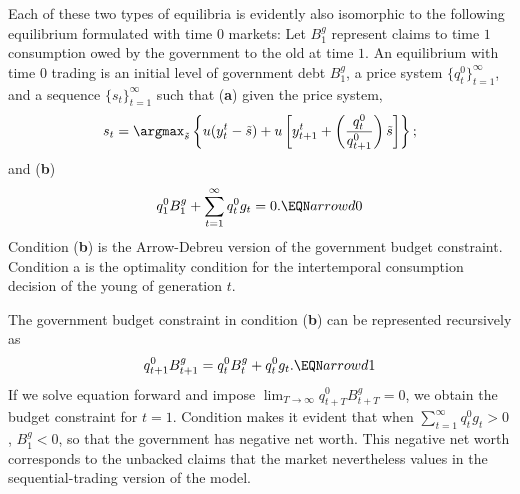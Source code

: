   Each of these two types of equilibria is evidently also
isomorphic to the following equilibrium
formulated with time $0$ markets:
\medskip
{} Let $B^g_1$ represent claims to time $1$ consumption
owed by the government to the old at time $1$.
An equilibrium with  time $0$ trading
is an initial level of government
debt $B^g_1$, a price system $\{q_t^0\}_{t=1}^\infty$, and
a sequence $\{s_t\}_{t=1}^\infty$ such that ({\bf a})
given the price system,
$$ s_t = \argmax_{\tilde s} \left\{ u(y_t^t - \tilde s)
     + u \left[y^t_{t+1}
 + \left({q_t^0 \over q^0_{t+1}}\right) \tilde s \right] \right\};
                                                    $$
and ({\bf b})
$$ q_1^0 B_1^g + \sum_{t=1}^\infty q_t^0 g_t = 0 . \EQN arrowd0 $$
\medskip
Condition ({\bf b}) is the  Arrow-Debreu version of the
government budget constraint.  Condition a is the optimality
condition for the intertemporal consumption decision of the young
of generation $t$.

  The government budget constraint in condition ({\bf b})
can be represented recursively as
$$ q^0_{t+1} B_{t+1}^g = q_t^0 B_t^g + q_t^0 g_t.\EQN arrowd1  $$
If we solve equation  forward and impose
$\lim_{T \rightarrow \infty} q^0_{t+T} B^g_{t+T} = 0$, we obtain
the budget constraint   for $t=1$.
Condition  makes it evident that
when $\sum_{t=1}^\infty q_t^0 g_t >0$, $B_1^g < 0$, so that the
government has negative net worth.  This negative net worth
corresponds to  the unbacked
claims that the market nevertheless values in the sequential-trading
version of the model.

%
